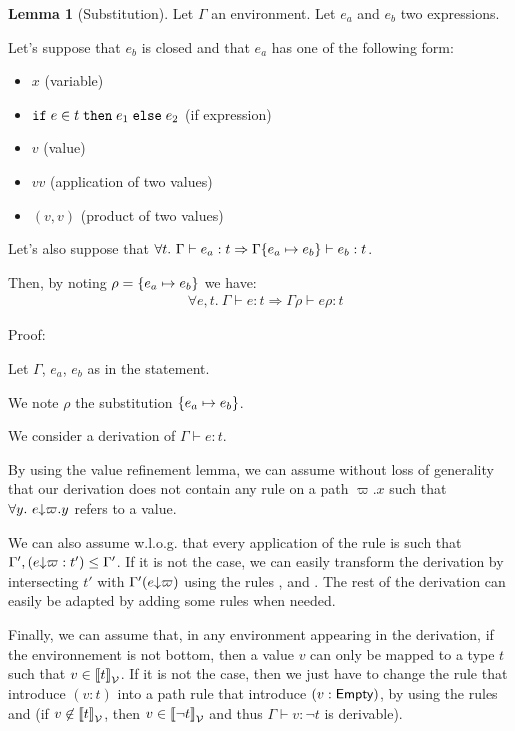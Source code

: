 \documentclass[a4paper]{article}
\theoremstyle{definition}
\newtheorem{lemma}{Lemma}
\begin{document}
        \begin{lemma}[Substitution]
          Let $\Gamma$ an environment. Let $e_a$ and $e_b$ two expressions.

          Let's suppose that $e_b$ is closed and that $e_a$ has one of the following form:
          \begin{itemize}
            \item $x$ (variable)
            \item $\texttt{if}\;e\in t\;\texttt{then}\;e_1\;\texttt{else}\;e_2$ (if expression)
            \item $v$ (value)
            \item $v v$ (application of two values)
            \item $(v,v)$ (product of two values)
          \end{itemize}
          Let's also suppose that $\forall t.\ \Gamma \vdash e_a : t \Rightarrow \Gamma\{e_a \mapsto e_b\} \vdash e_b:t$.
          
          Then, by noting $\rho = \{e_a \mapsto e_b\}$ we have:
          \begin{align*}
            &\forall e,t.\ \Gamma \vdash e:t \Rightarrow \Gamma\rho \vdash e\rho:t
          \end{align*}
        \end{lemma}

        Proof:

        Let $\Gamma$, $e_a$, $e_b$ as in the statement.

        We note $\rho$ the substitution $\{e_a \mapsto e_b\}$.

        We consider a derivation of $\Gamma \vdash e:t$.

        By using the value refinement lemma, we can assume without loss of generality that our derivation does not contain
        any rule  on a path $\varpi.x$ such that $\forall y.\ e{\downarrow}\varpi.y$ refers to a value.

        We can also assume w.l.o.g. that every application of the  rule is such that $\Gamma',(e{\downarrow}\varpi:t') \leq \Gamma'$. If it is not the case,
        we can easily transform the derivation by intersecting $t'$ with $\Gamma'(e{\downarrow}\varpi)$
        using the rules ,  and .
        The rest of the derivation can easily be adapted by adding some  rules when needed.

        Finally, we can assume that, in any environment appearing in the derivation, if the environnement is not bottom,
        then a value $v$ can only be mapped to a type $t$ such that $v\in{\llbracket t \rrbracket}_{\mathcal{V}}$. If it is not the case, then we just have to change the
         rule that introduce $(v:t)$ into a path rule that introduce $(v:\textsf{Empty})$,
        by using the rules  and  (if $v\not\in{\llbracket t \rrbracket}_{\mathcal{V}}$, then $v\in{\llbracket \neg t \rrbracket}_{\mathcal{V}}$
        and thus $\Gamma \vdash v:\neg t$ is derivable).
\end{document}
